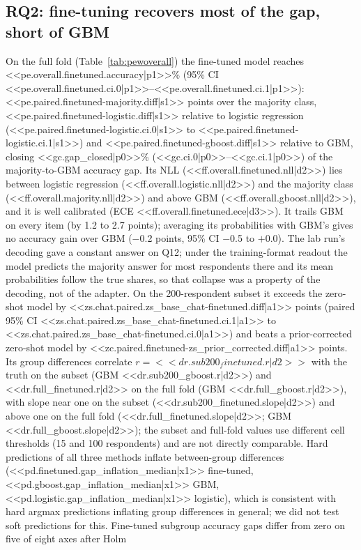 \documentclass[conference]{IEEEtran}
\begin{document}
\subsection{RQ2: fine-tuning recovers most of the gap, short of GBM}

\begin{table}[!t]
\caption{Pew fold-0 results, 46{,}209 held-out answers from 6{,}000 respondents. $^\dagger$MAE on ordinal items. $^\S$Error of the predicted subgroup-mean answer on a $[0,1]$ scale (hard predictions).}
\label{tab:pewoverall}
\centering
\footnotesize

\end{table}

On the full fold (Table~\ref{tab:pewoverall}) the fine-tuned model reaches <<pe.overall.finetuned.accuracy|p1>>\% (95\% CI <<pe.overall.finetuned.ci.0|p1>>--<<pe.overall.finetuned.ci.1|p1>>): <<pe.paired.finetuned-majority.diff|s1>> points over the majority class, <<pe.paired.finetuned-logistic.diff|s1>> relative to logistic regression (<<pe.paired.finetuned-logistic.ci.0|s1>> to <<pe.paired.finetuned-logistic.ci.1|s1>>) and <<pe.paired.finetuned-gboost.diff|s1>> relative to GBM, closing <<gc.gap_closed|p0>>\% (<<gc.ci.0|p0>>--<<gc.ci.1|p0>>) of the majority-to-GBM accuracy gap. Its NLL (<<ff.overall.finetuned.nll|d2>>) lies between logistic regression (<<ff.overall.logistic.nll|d2>>) and the majority class (<<ff.overall.majority.nll|d2>>) and above GBM (<<ff.overall.gboost.nll|d2>>), and it is well calibrated (ECE <<ff.overall.finetuned.ece|d3>>). It trails GBM on every item (by 1.2 to 2.7 points); averaging its probabilities with GBM's gives no accuracy gain over GBM ($-$0.2 points, 95\% CI $-$0.5 to $+$0.0). The lab run's decoding gave a constant answer on Q12; under the training-format readout the model predicts the majority answer for most respondents there and its mean probabilities follow the true shares, so that collapse was a property of the decoding, not of the adapter. On the 200-respondent subset it exceeds the zero-shot model by <<zs.chat.paired.zs_base_chat-finetuned.diff|a1>> points (paired 95\% CI <<zs.chat.paired.zs_base_chat-finetuned.ci.1|a1>> to <<zs.chat.paired.zs_base_chat-finetuned.ci.0|a1>>) and beats a prior-corrected zero-shot model by <<zc.paired.finetuned-zs_prior_corrected.diff|a1>> points. Its group differences correlate $r={<<dr.sub200_finetuned.r|d2>>}$ with the truth on the subset (GBM <<dr.sub200_gboost.r|d2>>) and <<dr.full_finetuned.r|d2>> on the full fold (GBM <<dr.full_gboost.r|d2>>), with slope near one on the subset (<<dr.sub200_finetuned.slope|d2>>) and above one on the full fold (<<dr.full_finetuned.slope|d2>>; GBM <<dr.full_gboost.slope|d2>>); the subset and full-fold values use different cell thresholds (15 and 100 respondents) and are not directly comparable. Hard predictions of all three methods inflate between-group differences (<<pd.finetuned.gap_inflation_median|x1>> fine-tuned, <<pd.gboost.gap_inflation_median|x1>> GBM, <<pd.logistic.gap_inflation_median|x1>> logistic), which is consistent with hard argmax predictions inflating group differences in general; we did not test soft predictions for this. Fine-tuned subgroup accuracy gaps differ from zero on five of eight axes after Holm 
\end{document}
